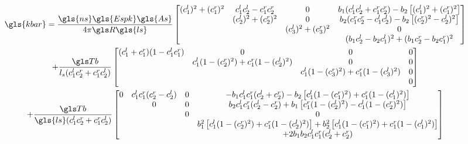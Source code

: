 \documentclass[../../thesis.tex]{subfiles}
\begin{document}
\footnotesize
\begin{multline}
\label{eqn:kbar_asymm_ncross}
\gls{kbar} = \frac{\gls{ns}\gls{Espk}\gls{As}}{4\pi \R \gls{ls}}
\begin{bmatrix}
(c_1^l)^2 + (c_1^r)^2   & c_1^lc_2^l - c_1^rc_2^r & 0 & b_1(c_1^lc_2^l + c_1^rc_2^r) - b_2\left[(c_1^l)^2 + (c_1^r)^2\right]\\
                        & (c_2^l)^2 + (c_2^r)^2   & 0 & b_2(c_1^rc_2^r - c_1^lc_2^l) - b_2\left[(c_2^r)^2 - c_2^l)^2\right]\\
                        &                         & (c_3^l)^2 + (c_3^r)^2 & 0\\
& & & (b_1c_2^l - b_2c_1^l)^2 + (b_1c_2^r - b_2c_1^r)^2
\end{bmatrix}\\
+ \frac{\Tb}{l_s(c_1^lc_2^r + c_1^rc_2^l)}
\begin{bmatrix}
   (c_1^l + c_1^r)(1 - c_1^lc_1^r)             & 0 & 0 & 0\\
&  c_1^l(1 - (c_2^r)^2) + c_1^r(1 - (c_2^l)^2) & 0 & 0\\
&& c_1^l(1-(c_3^r)^2) + c_1^r(1-(c_3^l)^2)     & 0\\
&&& 0
\end{bmatrix}\\
+ \frac{\Tb}{\gls{ls}(c_1^lc_2^r + c_1^rc_2^l)}
\begin{bmatrix}
0 & c_1^lc_1^r(c_2^r-c_2^l) & 0 & -b_1c_1^lc_1^r(c_2^l + c_2^r) - b_2\left[c_1^l(1 - (c_1^r)^2) + c_1^r(1- (c_1^l)^2)\right]\\
  & 0           & 0 &  b_2c_1^lc_1^r(c_2^l - c_2^r) + b_1\left[c_1^r(1 - (c_2^l)^2) - c_1^l(1-(c_2^r)^2)\right]\\
  &   & 0 & 0\\
  &   &   & b_1^2\left[c_1^l(1-(c_2^r)^2) + c_1^r(1-(c_2^l)^2)\right] + b_2^2\left[c_1^l(1-(c_1^r)^2) + c_1^r(1-(c_1^l)^2)\right]\\
  &   &   & + 2b_1b_2c_1^lc_1^r(c_2^l + c_2^r)
\end{bmatrix}
\end{multline}
\normalsize
\end{document}
